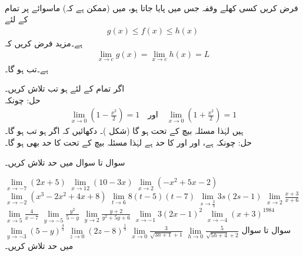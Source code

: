 \\
فرض کریں کسی کھلے وقفہ جس میں  پایا جاتا ہو، میں (ممکن ہے کہ) ماسوائے  پر تمام  کے لئے
\begin{align*}
g(x)\le f(x)\le h(x)
\end{align*}
ہے۔مزید فرض کریں کہ 
\begin{align*}
\lim_{x\to c} g(x)=\lim_{x\to c}h(x)=L
\end{align*}
ہے۔تب  ہو گا۔

اگر تمام  کے لئے  ہو تب  تلاش کریں۔\\
حل:\quad
چونکہ
\begin{align*}
\lim_{x\to 0} (1-\tfrac{x^2}{2})=1\quad \text{اور}\quad \lim_{x\to 0} (1+\tfrac{x^2}{2})=1
\end{align*}
ہیں لہٰذا مسئلہ بیچ کے تحت  ہو گا (شکل )۔
دکھائیں کہ اگر  ہو تب  ہو گا۔\\
حل:\quad
چونکہ  ہے، اور  اور  کا حد  ہے لہٰذا مسئلہ بیچ کے تحت  کا حد بھی  ہو گا۔ 


سوال  تا سوال  میں حد تلاش کریں۔

$\lim\limits_{x\to -7} (2x+5)$
$\lim\limits_{x\to 12} (10-3x)$
$\lim\limits_{x\to 2} (-x^2+5x-2)$
$\lim\limits_{x\to -2} (x^3-2x^2+4x+8)$
$\lim\limits_{t\to 6} 8(t-5)(t-7)$
$\lim\limits_{s\to \tfrac{2}{3}} 3s(2s-1)$
$\lim\limits_{x\to 2} \tfrac{x+3}{x+6}$
$\lim\limits_{x\to 5} \tfrac{4}{x-7}$
$\lim\limits_{y\to -5} \tfrac{y^2}{5-y}$
$\lim\limits_{y\to 2} \tfrac{y+2}{y^2+5y+6}$
$\lim\limits_{x\to -1} 3(2x-1)^2$
$\lim\limits_{x\to -4} (x+3)^{1984}$
$\lim\limits_{y\to -3} (5-y)^{\tfrac{4}{3}}$
$\lim\limits_{z\to 0} (2z-8)^{\tfrac{1}{3}}$
$\lim\limits_{x\to 0} \tfrac{3}{\sqrt{3h+1}+1}$
$\lim\limits_{h\to 0} \tfrac{5}{\sqrt{5h+4}+2}$
سوال  تا سوال  میں حد تلاش کریں۔

